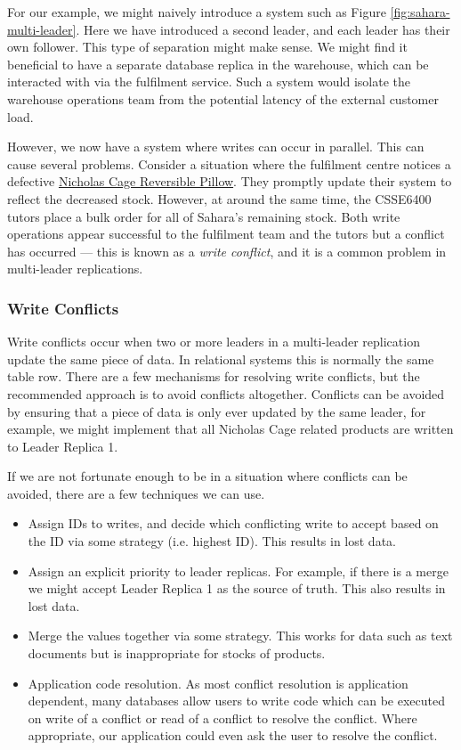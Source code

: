 For our example, we might naively introduce a system such as Figure \ref{fig:sahara-multi-leader}.
Here we have introduced a second leader, and each leader has their own follower.
This type of separation might make sense.
We might find it beneficial to have a separate database replica in the warehouse,
which can be interacted with via the fulfilment service.
Such a system would isolate the warehouse operations team from the potential latency of the external customer load.

However, we now have a system where writes can occur in parallel.
This can cause several problems.
Consider a situation where the fulfilment centre notices a defective
\href{https://www.amazon.com.au/dp/B09LYDDDR1}{Nicholas Cage Reversible Pillow}.
They promptly update their system to reflect the decreased stock.
However, at around the same time,
the CSSE6400 tutors place a bulk order for all of Sahara's remaining stock.
Both write operations appear successful to the fulfilment team and the tutors but a conflict has occurred ---
this is known as a \textit{write conflict}, and it is a common problem in multi-leader replications. 

\subsubsection*{Write Conflicts}
Write conflicts occur when two or more leaders in a multi-leader replication update the same piece of data.
In relational systems this is normally the same table row.
There are a few mechanisms for resolving write conflicts,
but the recommended approach is to avoid conflicts altogether.
Conflicts can be avoided by ensuring that a piece of data is only ever updated by the same leader,
for example, we might implement that all Nicholas Cage related products are written to Leader Replica 1.

If we are not fortunate enough to be in a situation where conflicts can be avoided,
there are a few techniques we can use.

\begin{itemize}
    \item Assign IDs to writes, and decide which conflicting write to accept based on the ID
          via some strategy (i.e. highest ID). This results in lost data.
    \item Assign an explicit priority to leader replicas.
          For example, if there is a merge we might accept Leader Replica 1 as the source of truth.
          This also results in lost data.
    \item Merge the values together via some strategy.
          This works for data such as text documents but is inappropriate for stocks of products.
    \item Application code resolution. As most conflict resolution is application dependent,
          many databases allow users to write code which can be executed on write of a conflict or
          read of a conflict to resolve the conflict.
          Where appropriate, our application could even ask the user to resolve the conflict.
\end{itemize}

